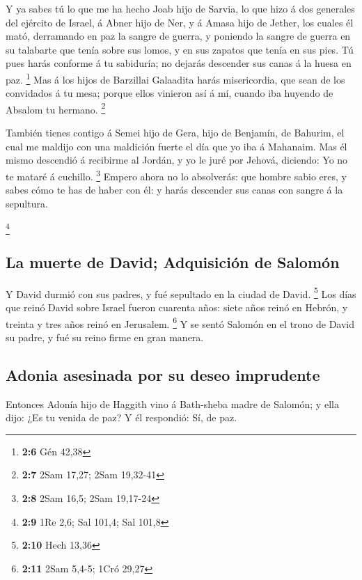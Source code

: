  Y ya sabes tú lo que me ha hecho Joab hijo de Sarvia, lo
que hizo á dos generales del ejército de Israel, á Abner hijo de Ner, y
á Amasa hijo de Jether, los cuales él mató, derramando en paz la sangre
de guerra, y poniendo la sangre de guerra en su talabarte que tenía
sobre sus lomos, y en sus zapatos que tenía en sus pies.  Tú
pues harás conforme á tu sabiduría; no dejarás descender sus canas á la
huesa en paz. \footnote{\textbf{2:6} Gén 42,38}  Mas á los
hijos de Barzillai Galaadita harás misericordia, que sean de los
convidados á tu mesa; porque ellos vinieron así á mí, cuando iba huyendo
de Absalom tu hermano. \footnote{\textbf{2:7} 2Sam 17,27; 2Sam 19,32-41}

 También tienes contigo á Semei hijo de Gera, hijo de
Benjamín, de Bahurim, el cual me maldijo con una maldición fuerte el día
que yo iba á Mahanaim. Mas él mismo descendió á recibirme al Jordán, y
yo le juré por Jehová, diciendo: Yo no te mataré á cuchillo. \footnote{\textbf{2:8}
  2Sam 16,5; 2Sam 19,17-24}  Empero ahora no lo absolverás:
que hombre sabio eres, y sabes cómo te has de haber con él: y harás
descender sus canas con sangre á la sepultura.

\footnote{\textbf{2:9} 1Re 2,6; Sal 101,4; Sal 101,8}

\hypertarget{la-muerte-de-david-adquisiciuxf3n-de-salomuxf3n}{%
\subsection{La muerte de David; Adquisición de
Salomón}\label{la-muerte-de-david-adquisiciuxf3n-de-salomuxf3n}}

 Y David durmió con sus padres, y fué sepultado en la
ciudad de David. \footnote{\textbf{2:10} Hech 13,36}  Los
días que reinó David sobre Israel fueron cuarenta años: siete años reinó
en Hebrón, y treinta y tres años reinó en Jerusalem. \footnote{\textbf{2:11}
  2Sam 5,4-5; 1Cró 29,27}  Y se sentó Salomón en el trono
de David su padre, y fué su reino firme en gran manera.

\hypertarget{adonia-asesinada-por-su-deseo-imprudente}{%
\subsection{Adonia asesinada por su deseo
imprudente}\label{adonia-asesinada-por-su-deseo-imprudente}}

 Entonces Adonía hijo de Haggith vino á Bath-sheba madre de
Salomón; y ella dijo: ¿Es tu venida de paz? Y él respondió: Sí, de paz.

